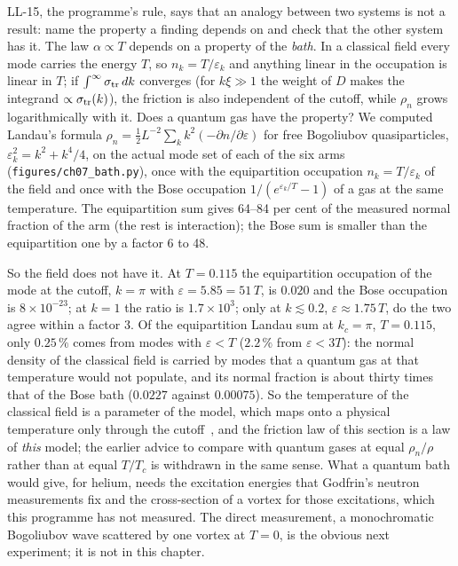 LL-15, the programme's rule, says that an analogy between two systems is not a result: name the property a finding depends on and check that the other system has it. The law $\alpha\propto T$ depends on a property of the \emph{bath}. In a classical field every mode carries the energy $T$, so $n_k=T/\varepsilon_k$ and anything linear in the occupation is linear in $T$; if
$\int^\infty\sigma_{\rm tr}\,dk$ converges (for $k\xi\gg1$ the weight of $D$ makes the integrand $\propto\sigma_{\rm tr}(k)$), the friction is also independent of the cutoff, while $\rho_n$ grows logarithmically with it. Does a quantum gas have the property? We computed Landau's formula $\rho_n=\tfrac12L^{-2}\sum_kk^2(-\partial n/\partial\varepsilon)$ for free Bogoliubov quasiparticles, $\varepsilon_k^2=k^2+k^4/4$, on the actual mode set of each of the six arms (\texttt{figures/ch07\_bath.py}), once with the equipartition occupation $n_k=T/\varepsilon_k$ of the field and once with the Bose occupation $1/(e^{\varepsilon_k/T}-1)$ of a gas at the same temperature. The equipartition sum gives 64--84 per cent of the measured normal fraction of the arm (the rest is interaction); the Bose sum is smaller than the equipartition one by a factor 6 to 48.

So the field does not have it. At $T=0.115$ the equipartition occupation of the mode at the cutoff, $k=\pi$ with $\varepsilon=5.85=51\,T$, is $0.020$ and the Bose occupation is $8\times10^{-23}$; at $k=1$ the ratio is $1.7\times10^{3}$; only at $k\lesssim0.2$, $\varepsilon\approx1.75\,T$, do the two agree within a factor $3$. Of the equipartition Landau sum at $k_c=\pi$, $T=0.115$, only
$0.25\,\%$ comes from modes with $\varepsilon<T$ ($2.2\,\%$ from $\varepsilon<3T$): the normal density of the classical field is carried by modes that a quantum gas at that temperature would not populate, and its normal fraction is about thirty times that of the Bose bath ($0.0227$ against $0.00075$). So the temperature of the classical field is a parameter of the model, which maps onto a physical
temperature only through the cutoff~\cite{Callens2026b}, and the friction law of this section is a law of \emph{this} model; the earlier advice to compare with quantum gases at equal $\rho_n/\rho$ rather than at equal $T/T_c$ is withdrawn in the same sense. What a quantum bath would give, for helium, needs the excitation energies that Godfrin's neutron measurements fix and the cross-section of a vortex for those excitations,
which this programme has not measured. The direct measurement, a monochromatic Bogoliubov wave scattered by one vortex at $T=0$, is the obvious next experiment; it is not in this chapter.


